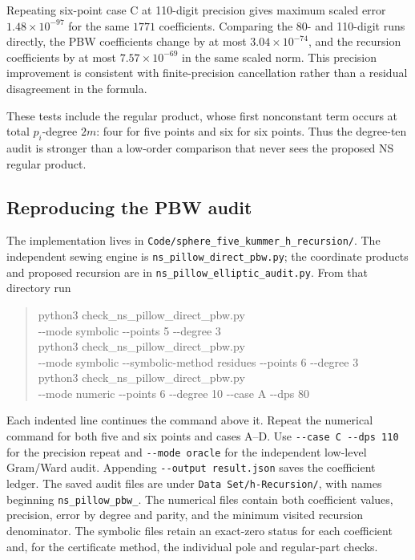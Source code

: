 \documentclass[11pt]{article}
\numberwithin{equation}{section}
\begin{document}
Repeating six-point case C at 110-digit precision gives maximum scaled
error $1.48\times10^{-97}$ for the same $1771$ coefficients. Comparing
the 80- and 110-digit runs directly, the PBW coefficients change by at
most $3.04\times10^{-74}$, and the recursion coefficients by at most
$7.57\times10^{-69}$ in the same scaled norm. This precision improvement
is consistent with finite-precision cancellation rather than a residual
disagreement in the formula.

These tests include the regular product, whose first nonconstant term
occurs at total $p_i$-degree $2m$: four for five points and six for six
points. Thus the degree-ten audit is stronger than a low-order comparison
that never sees the proposed NS regular product.

\subsection{Reproducing the PBW audit}

The implementation lives in
\nolinkurl{Code/sphere_five_kummer_h_recursion/}.
The independent sewing engine is \nolinkurl{ns_pillow_direct_pbw.py};
the coordinate products and proposed recursion are in
\nolinkurl{ns_pillow_elliptic_audit.py}. From that directory run
\begin{quote}\small\ttfamily
python3 check\_ns\_pillow\_direct\_pbw.py\\
\hspace*{1em}-{}-mode symbolic -{}-points 5 -{}-degree 3\\[0.4em]
python3 check\_ns\_pillow\_direct\_pbw.py\\
\hspace*{1em}-{}-mode symbolic -{}-symbolic-method residues -{}-points 6 -{}-degree 3\\[0.4em]
python3 check\_ns\_pillow\_direct\_pbw.py\\
\hspace*{1em}-{}-mode numeric -{}-points 6 -{}-degree 10 -{}-case A -{}-dps 80
\end{quote}
Each indented line continues the command above it. Repeat the numerical
command for both five and six points and cases A--D. Use
\texttt{-{}-case C -{}-dps 110} for the precision repeat and
\texttt{-{}-mode oracle} for the independent low-level Gram/Ward audit.
Appending \texttt{-{}-output result.json} saves the coefficient ledger.
The saved audit files are under \texttt{Data Set/h-Recursion/}, with
names beginning \texttt{ns\_pillow\_pbw\_}. The numerical files contain
both coefficient values, precision, error by degree and parity, and the
minimum visited recursion denominator. The symbolic files retain an
exact-zero status for each coefficient and, for the certificate method,
the individual pole and regular-part checks.
\end{document}
